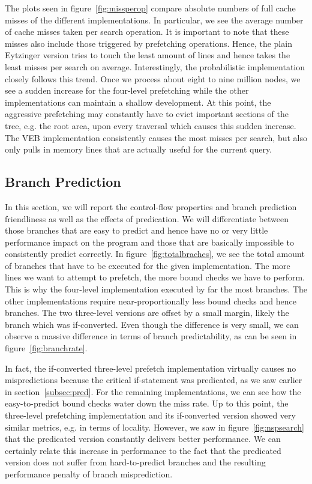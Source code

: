 \documentclass{article}
\begin{document}
The plots seen in figure~\ref{fig:missperop} compare absolute numbers of full cache misses of the different implementations. In particular, we see the average number of cache misses taken per search operation. It is important to note that these misses also include those triggered by prefetching operations. Hence, the plain Eytzinger version tries to touch the least amount of lines and hence takes the least misses per search on average. Interestingly, the probabilistic implementation closely follows this trend. Once we process about eight to nine million nodes, we see a sudden increase for the four-level prefetching while the other implementations can maintain a shallow development. At this point, the aggressive prefetching may constantly have to evict important sections of the tree, e.g. the root area, upon every traversal which causes this sudden increase. The VEB implementation consistently causes the most misses per search, but also only pulls in memory lines that are actually useful for the current query. 


\subsection{Branch Prediction}
\label{sub:br}
In this section, we will report the control-flow properties and branch prediction friendliness as well as the effects of predication. We will differentiate between those branches that are easy to predict and hence have no or very little performance impact on the program and those that are basically impossible to consistently predict correctly. In figure~\ref{fig:totalbraches}, we see the total amount of branches that have to be executed for the given implementation. The more lines we want to attempt to prefetch, the more bound checks we have to perform. This is why the four-level implementation executed by far the most branches. The other implementations require near-proportionally less bound checks and hence branches. The two three-level versions are offset by a small margin, likely the branch which was if-converted. Even though the difference is very small, we can observe a massive difference in terms of branch predictability, as can be seen in figure~\ref{fig:branchrate}.


In fact, the if-converted three-level prefetch implementation virtually causes no mispredictions because the critical if-statement was predicated, as we saw earlier in section~\ref{subsec:pred}. For the remaining implementations, we can see how the easy-to-predict bound checks water down the miss rate. Up to this point, the three-level prefetching implementation and its if-converted version showed very similar metrics, e.g. in terms of locality. However, we saw in figure~\ref{fig:nspsearch} that the predicated version constantly delivers better performance. We can certainly relate this increase in performance to the fact that the predicated version does not suffer from hard-to-predict branches and the resulting performance penalty of branch misprediction. 

\end{document}
